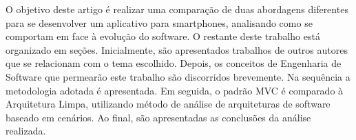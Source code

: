 O objetivo deste artigo é realizar uma comparação de duas abordagens diferentes para se desenvolver um aplicativo para smartphones, analisando como se comportam em face à evolução do software.
O restante deste trabalho está organizado em seções.
Inicialmente, são apresentados trabalhos de outros autores que se relacionam com o tema escolhido.
Depois, os conceitos de Engenharia de Software que permearão este trabalho são discorridos brevemente.
Na sequência a metodologia adotada é apresentada.
Em seguida, o padrão MVC é comparado à Arquitetura Limpa, utilizando método de análise de arquiteturas de software baseado em cenários.
Ao final, são apresentadas as conclusões da análise realizada.
